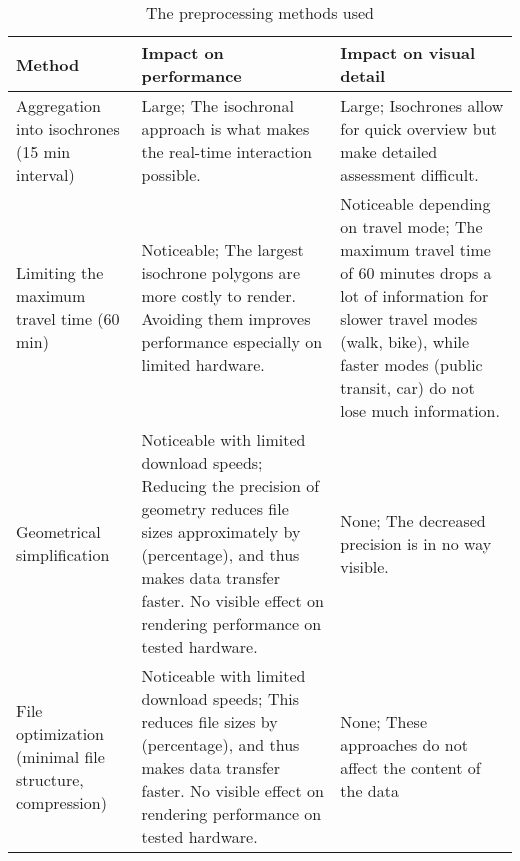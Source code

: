 \begin{table}[H]
	\caption{The preprocessing methods used}
	\label{tab:preprocessing methods}
	\centering
	\begin{tabular}{ | L{0.2\textwidth} | L{0.35\textwidth} | L{0.35\textwidth} | }
		\hline
		Method
		& Impact on performance
		& Impact on visual detail
		\\
		\hline
		\hline
		Aggregation into isochrones (15 min interval)
		& Large; The isochronal approach is what makes the real-time interaction possible.
		& Large; Isochrones allow for quick overview but make detailed assessment difficult.
		\\
		\hline
		Limiting the maximum travel time (60 min)
		& Noticeable; The largest isochrone polygons are more costly to render.
		Avoiding them improves performance especially on limited hardware.
		& Noticeable depending on travel mode;
		The maximum travel time of 60 minutes drops a lot of information for slower travel modes (walk, bike),  %
		while faster modes (public transit, car) do not lose much information.
		\\
		\hline
		Geometrical simplification
		& Noticeable with limited download speeds;
		Reducing the precision of geometry reduces file sizes approximately by (percentage),  %
		and thus makes data transfer faster.
		No visible effect on rendering performance on tested hardware.
		& None; The decreased precision is in no way visible.
		\\
		\hline
		File optimization (minimal file structure, compression)
		& Noticeable with limited download speeds;
		This reduces file sizes by (percentage),  %
		and thus makes data transfer faster.
		No visible effect on rendering performance on tested hardware.
		& None; These approaches do not affect the content of the data
		\\
		\hline
	\end{tabular}
\end{table}
